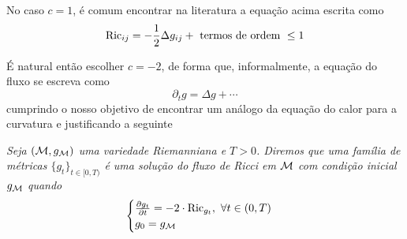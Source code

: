 \begin{oobs}
    No caso $c = 1$, é comum encontrar na literatura a equação acima escrita como
    \[
    \mathrm{Ric}_{ij} = -\frac{1}{2} \Delta g_{ij} + \text{ termos de ordem } \leq 1
    \]
    \end{oobs}
    É natural então escolher $c = -2$, de forma que, informalmente, a equação do fluxo se escreva como
    \[
    \partial_t g = \Delta g + \cdots
    \] 
    cumprindo o nosso objetivo de encontrar um análogo da equação do calor para a curvatura e justificando a seguinte
    \begin{deff}
      \textit{
      Seja $(\mathcal{M}, g_{\mathcal{M}})$ uma variedade Riemanniana e $T > 0$. Diremos que uma família de métricas $\{g_t\}_{t \in [0, T)}$ é uma solução do fluxo de Ricci em $\mathcal{M}$ com condição inicial $g_{\mathcal{M}}$ quando
      \begin{equation}\label{eqFluxoRicci}
      \begin{cases}
      \frac{\partial g_t}{\partial t} = - 2 \cdot \mathrm{Ric}_{g_t}, \ \forall t \in (0, T) \\
      g_0 = g_{\mathcal{M}}
      \end{cases}
      \end{equation}
      }
      \end{deff}
